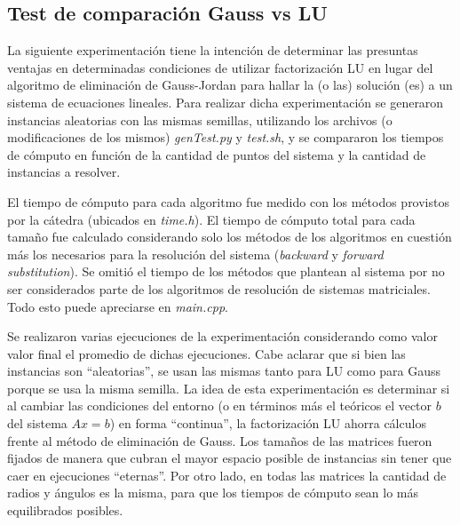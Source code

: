 \subsection{Test de comparación Gauss vs LU}
La siguiente experimentación tiene la intención de determinar las presuntas ventajas en determinadas condiciones de utilizar factorización LU en lugar del algoritmo de eliminación de Gauss-Jordan para hallar la (o las) solución (es) a un sistema de ecuaciones lineales. Para realizar dicha experimentación se generaron instancias aleatorias con las mismas semillas, utilizando los archivos (o modificaciones de los mismos) \emph{genTest.py} y \emph{test.sh}, y se compararon los tiempos de cómputo en función de la cantidad de puntos del sistema y la cantidad de instancias a resolver. 

El tiempo de cómputo para cada algoritmo fue medido con los métodos provistos por la cátedra (ubicados en \emph{time.h}). El tiempo de cómputo total para cada tamaño fue calculado considerando solo los métodos de los algoritmos en cuestión más los necesarios para la resolución del sistema (\emph{backward} y \emph{forward} \emph{substitution}). Se omitió el tiempo de los métodos que plantean al sistema por no ser considerados parte de los algoritmos de resolución de sistemas matriciales. Todo esto puede apreciarse en \emph{main.cpp}. 

Se realizaron varias ejecuciones de la experimentación considerando como valor valor final el promedio de dichas ejecuciones. Cabe aclarar que si bien las instancias son ``aleatorias'', se usan las mismas tanto para LU como para Gauss porque se usa la misma semilla. La idea de esta experimentación es determinar si al cambiar las condiciones del entorno (o en términos más el teóricos el vector $b$ del sistema $Ax=b$) en forma ``continua'', la factorización LU ahorra cálculos frente al método de eliminación de Gauss. Los tamaños de las matrices fueron fijados de manera que cubran el mayor espacio posible de instancias sin tener que caer en ejecuciones ``eternas''. Por otro lado, en todas las matrices la cantidad de radios y ángulos es la misma, para que los tiempos de cómputo sean lo más equilibrados posibles.
